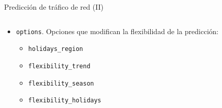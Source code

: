 \documentclass[aspectratio=169,xcolor=dvipsnames]{beamer}
\begin{document}
\begin{frame}{Predicción de tráfico de red (II)}
\begin{columns}
\begin{column}{0.6\textwidth}
\begin{itemize}
					\item \texttt{options}. Opciones que modifican la flexibilidad de la predicción:
					\begin{itemize}
						\item \texttt{holidays\_region}
						\item \texttt{flexibility\_trend}
						\item \texttt{flexibility\_season}
						\item \texttt{flexibility\_holidays}
					\end{itemize}
				\end{itemize}
			\end{column}
		\end{columns}
	\end{frame}
	
	
\end{document}
